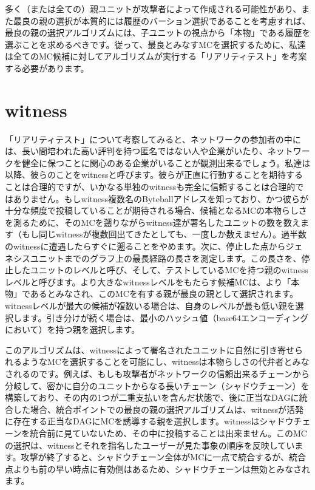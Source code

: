 \documentclass[a4paper, dvipdfmx]{jsarticle}
\begin{document}
多く（または全ての）親ユニットが攻撃者によって作成される可能性があり、また最良の親の選択が本質的には履歴のバーション選択であることを考慮すれば、最良の親の選択アルゴリズムには、子ユニットの視点から「本物」である履歴を選ぶことを求めるべきです。従って、最良とみなすMCを選択するために、私達は全てのMC候補に対してアルゴリズムが実行する「リアリティテスト」を考案する必要があります。

\section{witness}
「リアリティテスト」について考察してみると、ネットワークの参加者の中には、長い間培われた高い評判を持つ匿名ではない人や企業がいたり、ネットワークを健全に保つことに関心のある企業がいることが観測出来るでしょう。私達は以降、彼らのことをwitnessと呼びます。彼らが正直に行動することを期待することは合理的ですが、いかなる単独のwitnessも完全に信頼することは合理的ではありません。もしwitness複数名のByteballアドレスを知っており、かつ彼らが十分な頻度で投稿していることが期待される場合、候補となるMCの本物らしさを測るために、そのMCを遡りながらwitness達が署名したユニットの数を数えます（もし同じwitnessが複数回出てきたとしても、一度しか数えません）。過半数のwitnessに遭遇したらすぐに遡ることをやめます。次に、停止した点からジェネシスユニットまでのグラフ上の最長経路の長さを測定します。この長さを、停止したユニットのレベルと呼び、そして、テストしているMCを持つ親のwitnessレベルと呼びます。より大きなwitnessレベルをもたらす候補MCは、より「本物」であるとみなされ、このMCを有する親が最良の親として選択されます。witnessレベルが最大の候補が複数いる場合は、自身のレベルが最も低い親を選択します。引き分けが続く場合は、最小のハッシュ値（base64エンコーディングにおいて）を持つ親を選択します。

このアルゴリズムは、witnessによって署名されたユニットに自然に引き寄せられるようなMCを選択することを可能にし、witnessは本物らしさの代弁者とみなされるのです。例えば、もしも攻撃者がネットワークの信頼出来るチェーンから分岐して、密かに自分のユニットからなる長いチェーン（シャドウチェーン）を構築しており、その内の1つが二重支払いを含んだ状態で、後に正当なDAGに統合した場合、統合ポイントでの最良の親の選択アルゴリズムは、witnessが活発に存在する正当なDAGにMCを誘導する親を選択します。witnessはシャドウチェーンを統合前に見ていないため、その中に投稿することは出来ません。このMCの選択は、witnessとそれを指名したユーザーが見た事象の順序を反映しています。攻撃が終了すると、シャドウチェーン全体がMCに一点で統合するが、統合点よりも前の早い時点に有効側はあるため、シャドウチェーンは無効とみなされます。
\end{document}

